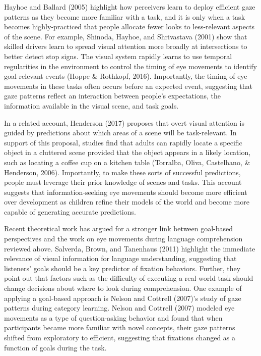\documentclass[,man,floatsintext]{apa6}
\begin{document}
Hayhoe and Ballard (2005) highlight how perceivers learn to deploy efficient gaze patterns as they become more familiar with a task, and it is only when a task becomes highly-practiced that people allocate fewer looks to less-relevant aspects of the scene. For example, Shinoda, Hayhoe, and Shrivastava (2001) show that skilled drivers learn to spread visual attention more broadly at intersections to better detect stop signs. The visual system rapidly learns to use temporal regularities in the environment to control the timing of eye movements to identify goal-relevant events (Hoppe \& Rothkopf, 2016). Importantly, the timing of eye movements in these tasks often occurs before an expected event, suggesting that gaze patterns reflect an interaction between people's expectations, the information available in the visual scene, and task goals.

In a related account, Henderson (2017) proposes that overt visual attention is guided by predictions about which areas of a scene will be task-relevant. In support of this proposal, studies find that adults can rapidly locate a specific object in a cluttered scene provided that the object appears in a likely location, such as locating a coffee cup on a kitchen table (Torralba, Oliva, Castelhano, \& Henderson, 2006). Importantly, to make these sorts of successful predictions, people must leverage their prior knowledge of scenes and tasks. This account suggests that information-seeking eye movements should become more efficient over development as children refine their models of the world and become more capable of generating accurate predictions.

Recent theoretical work has argued for a stronger link between goal-based perspectives and the work on eye movements during language comprehension reviewed above. Salverda, Brown, and Tanenhaus (2011) highlight the immediate relevance of visual information for language understanding, suggesting that listeners' goals should be a key predictor of fixation behaviors. Further, they point out that factors such as the difficulty of executing a real-world task should change decisions about where to look during comprehension. One example of applying a goal-based approach is Nelson and Cottrell (2007)'s study of gaze patterns during category learning. Nelson and Cottrell (2007) modeled eye movements as a type of question-asking behavior and found that when participants became more familiar with novel concepts, their gaze patterns shifted from exploratory to efficient, suggesting that fixations changed as a function of goals during the task.
\end{document}

